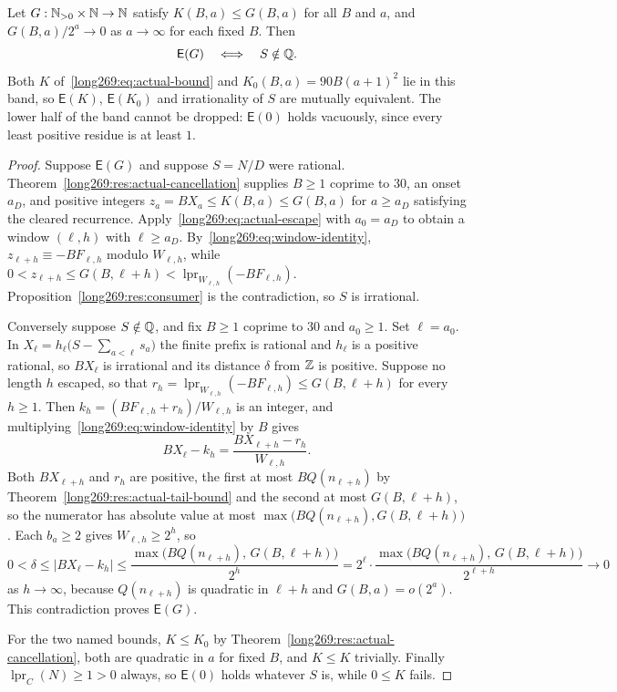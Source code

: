 \documentclass[11pt]{article}
\newcommand{\lpr}{\operatorname{lpr}}
\newcommand{\Esc}{\mathsf E}
\begin{document}
\begin{theorem}\label{long269:res:actual-escape-endpoint}
\label{long269:res:lead-escape-equivalence}\label{long269:res:windowconsumer}
Let $G:\mathbb{N}_{>0}\times\mathbb{N}\to\mathbb{N}$ satisfy $K(B,a)\le G(B,a)$ for all $B$ and $a$,
and $G(B,a)/2^{a}\to0$ as $a\to\infty$ for each fixed $B$.  Then
\[
 \Esc(G)\quad\Longleftrightarrow\quad S\notin\Q .
\]
Both $K$ of~\eqref{long269:eq:actual-bound} and $K_0(B,a)=90B(a+1)^{2}$ lie in this
band, so $\Esc(K)$, $\Esc(K_0)$ and irrationality of $S$ are mutually
equivalent.  The lower half of the band cannot be dropped: $\Esc(0)$ holds
vacuously, since every least positive residue is at least $1$.
\end{theorem}

\begin{proof}
Suppose $\Esc(G)$ and suppose $S=N/D$ were rational.
Theorem~\ref{long269:res:actual-cancellation} supplies $B\ge1$ coprime to $30$, an
onset $a_D$, and positive integers $z_a=BX_a\le K(B,a)\le G(B,a)$ for
$a\ge a_D$ satisfying the cleared recurrence.  Apply~\eqref{long269:eq:actual-escape}
with $a_0=a_D$ to obtain a window $(\ell,h)$ with $\ell\ge a_D$.
By~\eqref{long269:eq:window-identity}, $z_{\ell+h}\equiv-BF_{\ell,h}$ modulo
$W_{\ell,h}$, while $0<z_{\ell+h}\le G(B,\ell+h)<\lpr_{W_{\ell,h}}(-BF_{\ell,h})$.
Proposition~\ref{long269:res:consumer} is the contradiction, so $S$ is irrational.

Conversely suppose $S\notin\mathbb{Q}$, and fix $B\ge1$ coprime to $30$ and $a_0\ge1$.
Set $\ell=a_0$.  In $X_\ell=h_\ell\bigl(S-\sum_{a<\ell}s_a\bigr)$ the finite
prefix is rational and $h_\ell$ is a positive rational, so $BX_\ell$ is
irrational and its distance $\delta$ from $\mathbb{Z}$ is positive.  Suppose no length
$h$ escaped, so that $r_h=\lpr_{W_{\ell,h}}(-BF_{\ell,h})\le G(B,\ell+h)$ for
every $h\ge1$.  Then $k_h=(BF_{\ell,h}+r_h)/W_{\ell,h}$ is an integer, and
multiplying~\eqref{long269:eq:window-identity} by $B$ gives
\[
 BX_\ell-k_h=\frac{BX_{\ell+h}-r_h}{W_{\ell,h}} .
\]
Both $BX_{\ell+h}$ and $r_h$ are positive, the first at most
$BQ(n_{\ell+h})$ by Theorem~\ref{long269:res:actual-tail-bound} and the second at most
$G(B,\ell+h)$, so the numerator has absolute value at most
$\max\bigl(BQ(n_{\ell+h}),G(B,\ell+h)\bigr)$.  Each $b_a\ge2$ gives
$W_{\ell,h}\ge2^{h}$, so
\[
 0<\delta\le|BX_\ell-k_h|
 \le\frac{\max\bigl(BQ(n_{\ell+h}),\,G(B,\ell+h)\bigr)}{2^{h}}
 =2^{\ell}\cdot
 \frac{\max\bigl(BQ(n_{\ell+h}),\,G(B,\ell+h)\bigr)}{2^{\ell+h}}
 \longrightarrow0
\]
as $h\to\infty$, because $Q(n_{\ell+h})$ is quadratic in $\ell+h$ and
$G(B,a)=o(2^{a})$.  This contradiction proves $\Esc(G)$.

For the two named bounds, $K\le K_0$ by
Theorem~\ref{long269:res:actual-cancellation}, both are quadratic in $a$ for fixed $B$,
and $K\le K$ trivially.  Finally $\lpr_C(N)\ge1>0$ always, so $\Esc(0)$ holds
whatever $S$ is, while $0\le K$ fails.
\end{proof}
\end{document}
